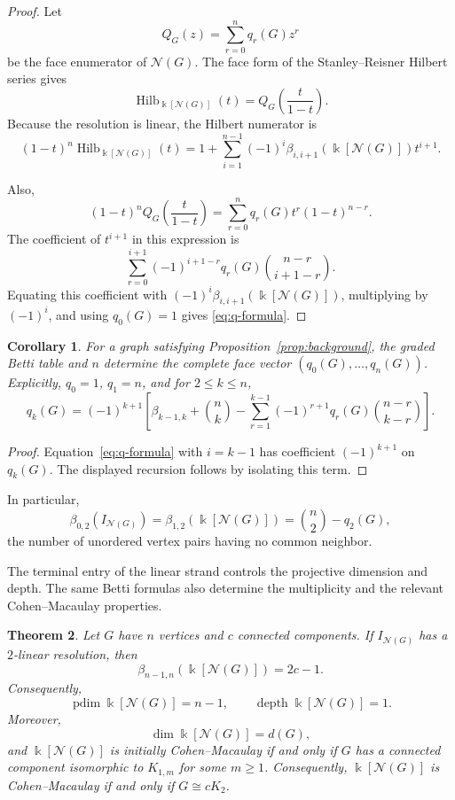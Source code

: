 \documentclass[11pt]{amsart}
\newtheorem{theorem}{Theorem}[section]
\newtheorem{corollary}[theorem]{Corollary}
\theoremstyle{definition}
\theoremstyle{remark}
\numberwithin{equation}{section}
\newcommand{\NN}{\mathcal N}
\newcommand{\pd}{\operatorname{pdim}}
\newcommand{\depth}{\operatorname{depth}}
\begin{document}
	\begin{proof}
		Let
		\[
		Q_G(z)=\sum_{r=0}^{n}q_r(G)z^r
		\]
		be the face enumerator of \(\NN(G)\). The face form of the Stanley--Reisner
		Hilbert series gives
		\[
		\operatorname{Hilb}_{\Bbbk[\NN(G)]}(t)
		=Q_G\left(\frac{t}{1-t}\right).
		\]
		Because the resolution is linear, the Hilbert numerator is
		\[
		(1-t)^n\operatorname{Hilb}_{\Bbbk[\NN(G)]}(t)
		=1+\sum_{i=1}^{n-1}
		(-1)^i\beta_{i,i+1}(\Bbbk[\NN(G)])t^{i+1}.
		\]
		
		Also,
		\[
		(1-t)^nQ_G\left(\frac{t}{1-t}\right)
		=\sum_{r=0}^{n}q_r(G)t^r(1-t)^{n-r}.
		\]
		The coefficient of \(t^{i+1}\) in this expression is
		\[
		\sum_{r=0}^{i+1}
		(-1)^{i+1-r}q_r(G)\binom{n-r}{i+1-r}.
		\]
		Equating this coefficient with
		\((-1)^i\beta_{i,i+1}(\Bbbk[\NN(G)])\), multiplying by \((-1)^i\), and
		using \(q_0(G)=1\) gives \eqref{eq:q-formula}.
	\end{proof}

	\begin{corollary}\label{cor:q-recovery}
		For a graph satisfying Proposition~\ref{prop:background}, the graded Betti
		table and \(n\) determine the complete face vector
		\((q_0(G),\ldots,q_n(G))\). Explicitly, \(q_0=1\), \(q_1=n\), and for
		\(2\le k\le n\),
		\begin{equation}\label{eq:q-inversion}
		q_k(G)=(-1)^{k+1}\left[
		\beta_{k-1,k}+\binom nk
		-\sum_{r=1}^{k-1}(-1)^{r+1}q_r(G)
		\binom{n-r}{k-r}
		\right].
		\end{equation}
	\end{corollary}

	\begin{proof}
		Equation~\eqref{eq:q-formula} with \(i=k-1\) has coefficient
		\((-1)^{k+1}\) on \(q_k(G)\). The displayed recursion follows by isolating
		this term.
	\end{proof}
	
	In particular,
	\[
	\beta_{0,2}(I_{\NN(G)})
	=\beta_{1,2}(\Bbbk[\NN(G)])
	=\binom n2-q_2(G),
	\]
	the number of unordered vertex pairs having no common neighbor.
	
	The terminal entry of the linear strand controls the projective dimension and
	depth. The same Betti formulas also determine the multiplicity and the relevant
	Cohen--Macaulay properties.

	\begin{theorem}\label{thm:terminal}
		Let \(G\) have \(n\) vertices and \(c\) connected components. If
		\(I_{\NN(G)}\) has a \(2\)-linear resolution, then
		\[
		\beta_{n-1,n}(\Bbbk[\NN(G)])=2c-1.
		\]
		Consequently,
		\begin{equation}\label{eq:pd-depth}
			\pd\Bbbk[\NN(G)]=n-1,\qquad
			\depth\Bbbk[\NN(G)]=1.
		\end{equation}
		Moreover,
		\begin{equation}\label{eq:dimension}
			\dim\Bbbk[\NN(G)]=d(G),
		\end{equation}
		and \(\Bbbk[\NN(G)]\) is initially Cohen--Macaulay if and only if
		\(G\) has a connected component isomorphic to \(K_{1,m}\) for some
		\(m\ge1\). Consequently, \(\Bbbk[\NN(G)]\) is Cohen--Macaulay if and
		only if \(G\cong cK_2\).
	\end{theorem}
	
\end{document}
